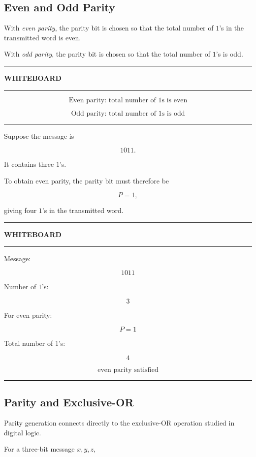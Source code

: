 \documentclass[11pt]{article}
\newenvironment{whiteboard}
{
    \par\medskip
    \begin{center}
    \begin{minipage}{0.94\textwidth}
    \hrule
    \vspace{0.4em}
    \textbf{\large WHITEBOARD}
    \vspace{0.3em}
    \hrule
    \vspace{0.7em}
}
{
    \vspace{0.5em}
    \hrule
    \end{minipage}
    \end{center}
    \medskip
}
\begin{document}
\subsection{Even and Odd Parity}

With \emph{even parity}, the parity bit is chosen so that the total number of
\(1\)'s in the transmitted word is even.

With \emph{odd parity}, the parity bit is chosen so that the total number of
\(1\)'s is odd.

\begin{whiteboard}
\[
\boxed{\text{Even parity: total number of 1s is even}}
\]

\[
\boxed{\text{Odd parity: total number of 1s is odd}}
\]
\end{whiteboard}

Suppose the message is

\[
1011.
\]

It contains three \(1\)'s.

To obtain even parity, the parity bit must therefore be

\[
P=1,
\]

giving four \(1\)'s in the transmitted word.

\begin{whiteboard}
Message:

\[
1011
\]

Number of \(1\)'s:

\[
3
\]

For even parity:

\[
P=1
\]

Total number of \(1\)'s:

\[
4
\]

\[
\boxed{\text{even parity satisfied}}
\]
\end{whiteboard}

\subsection{Parity and Exclusive-OR}

Parity generation connects directly to the exclusive-OR operation studied in
digital logic.

For a three-bit message \(x,y,z\),
\end{document}
